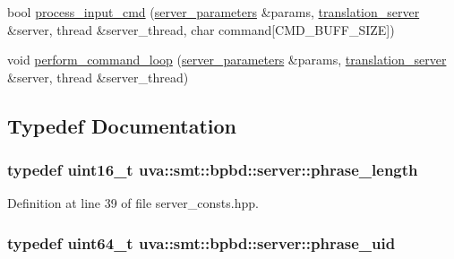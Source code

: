 \begin{DoxyCompactItemize}
\item 
bool \hyperlink{namespaceuva_1_1smt_1_1bpbd_1_1server_a4385d92deb1529577d431efd2aa5d892}{process\+\_\+input\+\_\+cmd} (\hyperlink{structuva_1_1smt_1_1bpbd_1_1server_1_1server__parameters}{server\+\_\+parameters} \&params, \hyperlink{classuva_1_1smt_1_1bpbd_1_1server_1_1translation__server}{translation\+\_\+server} \&server, thread \&server\+\_\+thread, char command\mbox{[}C\+M\+D\+\_\+\+B\+U\+F\+F\+\_\+\+S\+I\+Z\+E\mbox{]})
\item 
void \hyperlink{namespaceuva_1_1smt_1_1bpbd_1_1server_ae58e404a227b2fc3b03fea84f7e91a83}{perform\+\_\+command\+\_\+loop} (\hyperlink{structuva_1_1smt_1_1bpbd_1_1server_1_1server__parameters}{server\+\_\+parameters} \&params, \hyperlink{classuva_1_1smt_1_1bpbd_1_1server_1_1translation__server}{translation\+\_\+server} \&server, thread \&server\+\_\+thread)
\end{DoxyCompactItemize}


\subsection{Typedef Documentation}
\hypertarget{namespaceuva_1_1smt_1_1bpbd_1_1server_af068a19c2e03116caf3e3827a3e40e35}{}
\subsubsection[{phrase\+\_\+length}]{\setlength{\rightskip}{0pt plus 5cm}typedef uint16\+\_\+t {\bf uva\+::smt\+::bpbd\+::server\+::phrase\+\_\+length}}\label{namespaceuva_1_1smt_1_1bpbd_1_1server_af068a19c2e03116caf3e3827a3e40e35}


Definition at line 39 of file server\+\_\+consts.\+hpp.

\hypertarget{namespaceuva_1_1smt_1_1bpbd_1_1server_ad18d4cdf5504e76c22b0c124ff60b44f}{}
\subsubsection[{phrase\+\_\+uid}]{\setlength{\rightskip}{0pt plus 5cm}typedef uint64\+\_\+t {\bf uva\+::smt\+::bpbd\+::server\+::phrase\+\_\+uid}}\label{namespaceuva_1_1smt_1_1bpbd_1_1server_ad18d4cdf5504e76c22b0c124ff60b44f}


